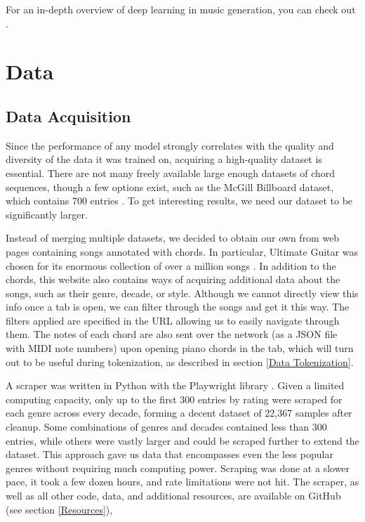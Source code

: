\documentclass{article}
\begin{document}
For an in-depth overview of deep learning in music generation, you can check out \cite{DBLP:journals/corr/abs-1709-01620}.

\section{Data}

\subsection{Data Acquisition}

Since the performance of any model strongly correlates with the quality and diversity of the data it was trained on, acquiring a high-quality dataset is essential. There are not many freely available large enough datasets of chord sequences, though a few options exist, such as the McGill Billboard dataset, which contains 700 entries \cite{burgoyne2011expert}. To get interesting results, we need our dataset to be significantly larger.

Instead of merging multiple datasets, we decided to obtain our own from web pages containing songs annotated with chords. In particular, Ultimate Guitar was chosen for its enormous collection of over a million songs \cite{ultimateguitar}. In addition to the chords, this website also contains ways of acquiring additional data about the songs, such as their genre, decade, or style. Although we cannot directly view this info once a tab is open, we can filter through the songs and get it this way. The filters applied are specified in the URL allowing us to easily navigate through them. The notes of each chord are also sent over the network (as a JSON file with MIDI note numbers) upon opening piano chords in the tab, which will turn out to be useful during tokenization, as described in section \ref{Data Tokenization}.

A scraper was written in Python with the Playwright library \cite{playwright}. Given a limited computing capacity, only up to the first 300 entries by rating were scraped for each genre across every decade, forming a decent dataset of 22,367 samples after cleanup. Some combinations of genres and decades contained less than 300 entries, while others were vastly larger and could be scraped further to extend the dataset. This approach gave us data that encompasses even the less popular genres without requiring much computing power. Scraping was done at a slower pace, it took a few dozen hours, and rate limitations were not hit. The scraper, as well as all other code, data, and additional resources, are available on GitHub (see section \ref{Resources}),
\end{document}
